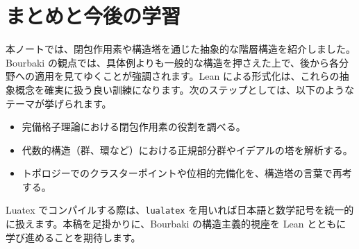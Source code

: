\documentclass[12pt]{ltjsarticle}
\begin{document}
\section{まとめと今後の学習}

本ノートでは、閉包作用素や構造塔を通じた抽象的な階層構造を紹介しました。Bourbaki の観点では、具体例よりも一般的な構造を押さえた上で、後から各分野への適用を見てゆくことが強調されます。Lean による形式化は、これらの抽象概念を確実に扱う良い訓練になります。次のステップとしては、以下のようなテーマが挙げられます。

\begin{itemize}
  \item 完備格子理論における閉包作用素の役割を調べる。
  \item 代数的構造（群、環など）における正規部分群やイデアルの塔を解析する。
  \item トポロジーでのクラスターポイントや位相的完備化を、構造塔の言葉で再考する。
\end{itemize}

Luatex でコンパイルする際は、\texttt{lualatex} を用いれば日本語と数学記号を統一的に扱えます。本稿を足掛かりに、Bourbaki の構造主義的視座を Lean とともに学び進めることを期待します。
\end{document}
